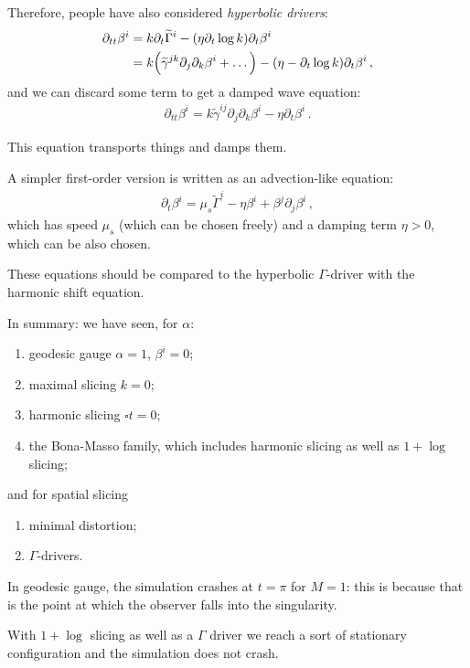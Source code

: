 \documentclass[main.tex]{subfiles}
\begin{document}
Therefore, people have also considered \emph{hyperbolic drivers}: 
%
\begin{align}
\partial_{tt} \beta^{i} &= k \partial_{t} \widetilde{\Gamma}^{i} - \qty(\eta \partial_{t} \log k) \partial_{t} \beta^{i}   \\
&= k \qty(\widetilde{\gamma}^{jk} \partial_{j} \partial_{k} \beta^{i} + \dots ) - \qty(\eta - \partial_{t} \log k) \partial_{t} \beta^{i}
\,,
\end{align}
%
and we can discard some term to get a damped wave equation:
%
\begin{align}
\partial_{tt} \beta^{i} = k \widetilde{\gamma}^{ij} \partial_{j} \partial_{k} \beta^{i} - \eta \partial_{t} \beta^{i} 
\,.
\end{align}

This equation transports things and damps them. 

A simpler first-order version is written as an advection-like equation:
%
\begin{align}
\partial_{t} \beta^{i} = \mu _s \widetilde{\Gamma}^{i} - \eta \beta^{i} + \beta^{j} \partial_{j} \beta^{i}
\,,
\end{align}
%
which has speed \(\mu _s\) (which can be chosen freely) and a damping term \(\eta > 0\), which can be also chosen. 

These equations should be compared to the hyperbolic \(\Gamma \)-driver with the harmonic shift equation. 

In summary: 
we have seen, for \(\alpha \):
\begin{enumerate}
    \item geodesic gauge \(\alpha = 1\), \(\beta^{i} = 0\);
    \item maximal slicing \(k = 0\);
    \item harmonic slicing \(\square t = 0\);
    \item the Bona-Masso family, which includes harmonic slicing as well as \(1+ \log\) slicing;
\end{enumerate}

and for spatial slicing 
\begin{enumerate}
    \item minimal distortion;
    \item \(\Gamma \)-drivers.
\end{enumerate}

In geodesic gauge, the simulation crashes at \(t = \pi \) for \(M = 1\): this is because that is the point at which the observer falls into the singularity. 

With \(1 + \log\) slicing as well as a \(\Gamma \) driver we reach a sort of stationary configuration and the simulation does not crash. 
\end{document}
